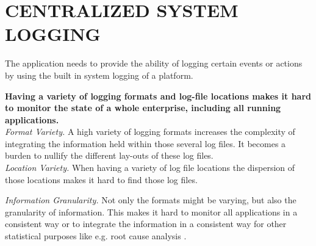 \newpage
\section*{CENTRALIZED SYSTEM LOGGING}



The application needs to provide the ability of logging certain events or actions 
by using the built in system logging of a platform. 

\begin{center}
  
\end{center}

\textbf{Having a variety of logging formats and log-file locations makes it hard to monitor the state of a whole enterprise, including all running applications.}\\

\textit{Format Variety.} A high variety of logging formats increases the complexity of integrating the information held within those several log files. It becomes a burden to nullify
the different lay-outs of these log files.\\ 

\textit{Location Variety.} When having a variety of log file locations the dispersion of those locations makes it hard to find those log files.

\textit{Information Granularity.} Not only the formats might be varying, but also the granularity of information. This makes it hard to monitor all applications in a consistent way or to integrate the information in a consistent way for other statistical purposes like e.g. root cause analysis \cite{conf/mkwi/PaschkeS06}.

\begin{center}
   
\end{center}

